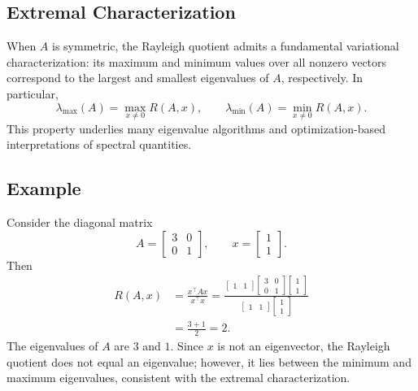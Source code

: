 \documentclass[11pt]{article}
\begin{document}
\subsection{Extremal Characterization}
When $A$ is symmetric, the Rayleigh quotient admits a fundamental variational characterization: its maximum and minimum values over all nonzero vectors correspond to the largest and smallest eigenvalues of $A$, respectively. In particular,
\begin{equation}
\lambda_{\max}(A) = \max_{x \neq 0} R(A,x),
\qquad
\lambda_{\min}(A) = \min_{x \neq 0} R(A,x).
\end{equation}
This property underlies many eigenvalue algorithms and optimization-based interpretations of spectral quantities.

\subsection{Example}
Consider the diagonal matrix
\begin{equation}
A = 
\begin{bmatrix}
3 & 0 \\
0 & 1
\end{bmatrix},
\qquad
x =
\begin{bmatrix}
1 \\
1
\end{bmatrix}.
\end{equation}
Then
\begin{align}
R(A,x)
&= \frac{x^\top A x}{x^\top x}
= \frac{
\begin{bmatrix}1 & 1\end{bmatrix}
\begin{bmatrix}3 & 0 \\ 0 & 1\end{bmatrix}
\begin{bmatrix}1 \\ 1\end{bmatrix}
}{
\begin{bmatrix}1 & 1\end{bmatrix}
\begin{bmatrix}1 \\ 1\end{bmatrix}
}
\\
&= \frac{3 + 1}{2}
= 2.
\end{align}
The eigenvalues of $A$ are $3$ and $1$. Since $x$ is not an eigenvector, the Rayleigh quotient does not equal an eigenvalue; however, it lies between the minimum and maximum eigenvalues, consistent with the extremal characterization.
\end{document}
